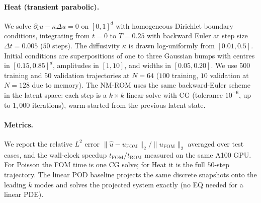 \documentclass{article}
\begin{document}
\paragraph{Heat (transient parabolic).}
We solve $\partial_t u - \kappa \Delta u = 0$ on $[0,1]^d$ with
homogeneous Dirichlet boundary conditions, integrating from $t = 0$
to $T = 0.25$ with backward Euler at step size $\Delta t = 0.005$
($50$ steps). The diffusivity $\kappa$ is drawn log-uniformly from
$[0.01, 0.5]$. Initial conditions are superpositions of one to three
Gaussian bumps with centres in $[0.15, 0.85]^d$, amplitudes in
$[1, 10]$, and widths in $[0.05, 0.20]$. We use $500$ training and
$50$ validation trajectories at $N = 64$ ($100$ training, $10$
validation at $N = 128$ due to memory). The NM-ROM uses the same
backward-Euler scheme in the latent space: each step is a
$k \times k$ linear solve with CG (tolerance $10^{-6}$, up to $1{,}000$
iterations), warm-started from the previous latent state.

\paragraph{Metrics.}
We report the relative $L^2$ error
$\|\hat u - u_\mathrm{FOM}\|_2 / \|u_\mathrm{FOM}\|_2$ averaged over
test cases, and the wall-clock speedup
$t_\mathrm{FOM} / t_\mathrm{ROM}$ measured on the same A100 GPU.
For Poisson the FOM time is one CG solve; for Heat it is the full
$50$-step trajectory. The linear POD baseline projects the same
discrete snapshots onto the leading $k$ modes and solves the projected system
exactly (no EQ needed for a linear PDE).
\end{document}

